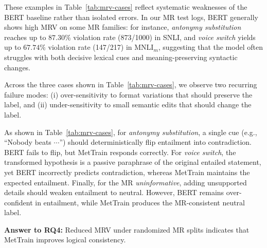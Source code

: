 \documentclass[lettersize,journal]{IEEEtran}
\begin{document}
These examples in Table~\ref{tab:mrv-cases} reflect systematic weaknesses of the BERT baseline rather than isolated errors.
In our MR test logs, BERT generally shows high MRV on some MR families: for instance,
\textit{antonymy substitution} reaches up to $87.30\%$ violation rate (873/1000) in SNLI, and
\textit{voice switch} yields up to $67.74\%$ violation rate (147/217) in MNLI$_m$, suggesting that the model often struggles with both decisive lexical cues and meaning-preserving syntactic changes.

Across the three cases shown in Table~\ref{tab:mrv-cases}, we observe two recurring failure modes: (i) over-sensitivity
to format variations that should preserve the label, and (ii) under-sensitivity to small
semantic edits that should change the label. 

As shown in Table~\ref{tab:mrv-cases}, for \textit{antonymy substitution},
a single cue (e.g., ``Nobody beats $\cdots$'') should deterministically flip entailment into
contradiction. BERT fails to flip, but MetTrain responds correctly. For \textit{voice switch}, the transformed hypothesis is a passive paraphrase of the original entailed statement, yet BERT incorrectly predicts contradiction, whereas MetTrain maintains the expected entailment. Finally, for the MR \textit{uninformative}, adding unsupported details should weaken entailment to neutral. However, BERT remains over-confident in entailment, while MetTrain produces the MR-consistent neutral label.





\begin{tcolorbox}[sharp corners,left=1pt,right=1pt,top=1pt,bottom=1pt,boxsep=1pt,colframe=black]
	\textbf{Answer to RQ4:} Reduced MRV under randomized MR splits indicates that MetTrain improves logical consistency.
\end{tcolorbox}
\end{document}

